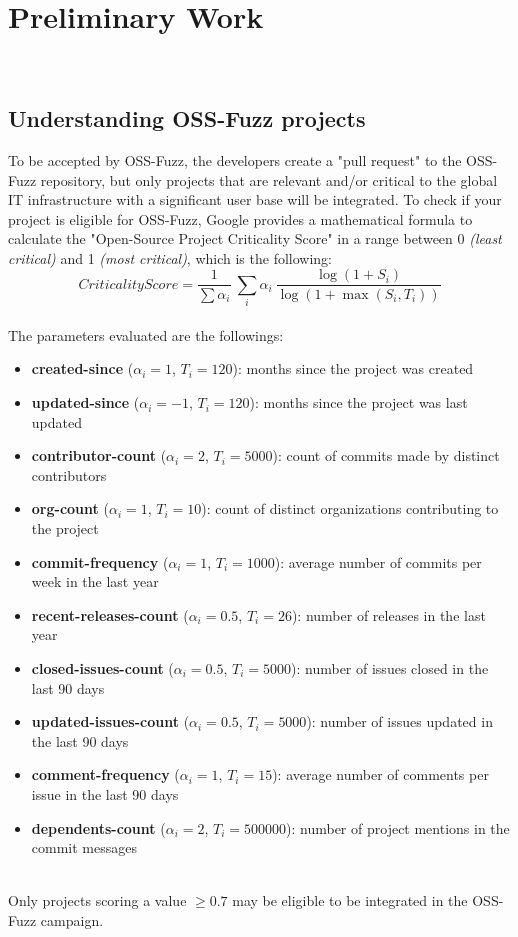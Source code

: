 \documentclass[Lau,oneside]{sapthesis}%
\begin{document}
\newpage
\chapter{Preliminary Work}
\ \\
\section{Understanding OSS-Fuzz projects}
To be accepted by OSS-Fuzz, the developers create a "pull request" to the OSS-Fuzz repository, but only projects that are relevant and/or critical to the global IT infrastructure with a significant user base will be integrated.
\newline \newline
To check if your project is eligible for OSS-Fuzz, Google provides a mathematical formula to calculate the "Open-Source Project Criticality Score" \cite{ref:score} in a range between 0 \textit{(least critical)} and 1 \textit{(most critical)}, which is the following:
\ \\
\begin{equation}
    CriticalityScore = \frac{1}{\sum \alpha_i}\  \sum_i \alpha_i \ \frac{\log(1+S_i)}{\log(1+\max(S_i,T_i))}
\end{equation}
\ \\
The parameters evaluated are the followings:
\begin{itemize}
    \item \textbf{created-since} ($\alpha_i = 1$, $T_i = 120$): months since the project was created
    \item \textbf{updated-since} ($\alpha_i = -1$, $T_i = 120$): months since the project was last updated
    \item \textbf{contributor-count} ($\alpha_i = 2$, $T_i = 5000$): count of commits made by distinct contributors
    \item \textbf{org-count} ($\alpha_i = 1$, $T_i = 10$): count of distinct organizations contributing to the project
    \item \textbf{commit-frequency} ($\alpha_i = 1$, $T_i = 1000$): average number of commits per week in the last year
    \item \textbf{recent-releases-count} ($\alpha_i = 0.5$, $T_i = 26$): number of releases in the last year
    \item \textbf{closed-issues-count} ($\alpha_i = 0.5$, $T_i = 5000$): number of issues closed in the last 90 days
    \item \textbf{updated-issues-count} ($\alpha_i = 0.5$, $T_i = 5000$): number of issues updated in the last 90 days
    \item \textbf{comment-frequency} ($\alpha_i = 1$, $T_i = 15$): average number of comments per issue in the last 90 days
    \item \textbf{dependents-count} ($\alpha_i = 2$, $T_i = 500000$): number of project mentions in the commit messages
\end{itemize}
\ \\
Only projects scoring a value $\geq 0.7$ may be eligible to be integrated in the OSS-Fuzz campaign.
\end{document}
